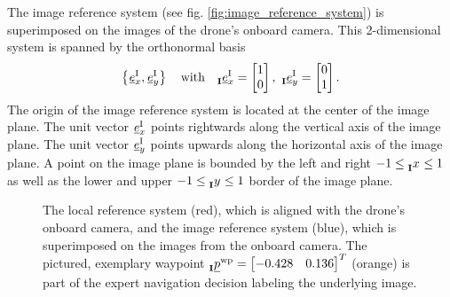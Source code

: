 The image reference system (see fig. \ref{fig:image_reference_system}) 
is superimposed on the images of the drone's onboard camera.
This 2-dimensional system is spanned by the orthonormal basis
\begin{equation}
    \left\{
        \unitvec[]{\text I}{x}{}{},
        \unitvec[]{\text I}{y}{}{}
    \right\}
    \quad \text{with} \quad 
    \unitvec[]{\text I}{x}{\irs}{} = \begin{bmatrix} 1 \\ 0 \end{bmatrix},\ 
    \unitvec[]{\text I}{y}{\irs}{} = \begin{bmatrix} 0 \\ 1 \end{bmatrix}.
\end{equation}
The origin of the image reference system 
is located at the center of the image plane.
The unit vector 
$\unitvec[]{\text I}{x}{}{}$  
points rightwards along the vertical axis of the image plane.
The unit vector 
$\unitvec[]{\text I}{y}{}{}$  
points upwards along the horizontal axis of the image plane.
A point on the image plane 
is bounded by the left and right
$ -1 \le \x[]{}{}{\irs}{} \le 1 $
as well as the lower and upper
$ -1 \le \y[]{}{}{\irs}{} \le 1 $
border of the image plane.
\begin{figure}[h]
    \centering
    \caption[
        Local and image reference systems
    ]{
        The local reference system (red), which is aligned with the drone's onboard camera,
        and the image reference system (blue), which is superimposed on the images from the onboard camera.
        The pictured, exemplary waypoint
        $\pos[]{\wayp}{}{\irs}{} = \begin{bmatrix} -0.428 & 0.136 \end{bmatrix}^T$
        (orange)
        is part of the expert navigation decision labeling the underlying image.
        \label{fig:local_and_image_reference_system}
    }
\end{figure}






